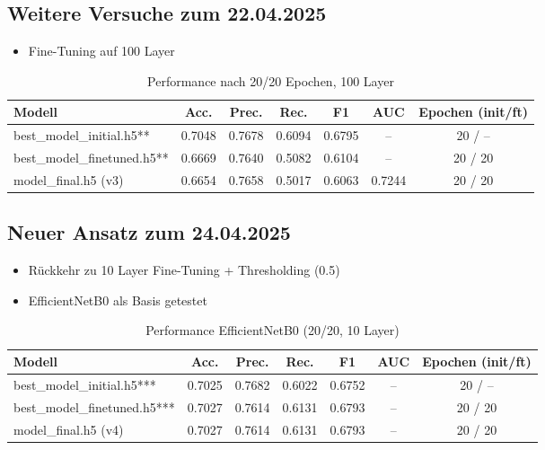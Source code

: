 \subsection*{Weitere Versuche zum 22.04.2025}
\begin{itemize}
  \item Fine-Tuning auf 100 Layer
\end{itemize}
\begin{table}[h]
\centering
\caption{Performance nach 20/20 Epochen, 100 Layer}
\begin{tabular}{lcccccc}
\toprule
Modell                         & Acc.   & Prec.  & Rec.   & F1     & AUC    & Epochen (init/ft) \\
\midrule
best\_model\_initial.h5**      & 0.7048 & 0.7678 & 0.6094 & 0.6795 & –      & 20 / –            \\
best\_model\_finetuned.h5**    & 0.6669 & 0.7640 & 0.5082 & 0.6104 & –      & 20 / 20           \\
model\_final.h5 (v3)           & 0.6654 & 0.7658 & 0.5017 & 0.6063 & 0.7244 & 20 / 20           \\
\bottomrule
\end{tabular}
\end{table}

\subsection*{Neuer Ansatz zum 24.04.2025}
\begin{itemize}
  \item Rückkehr zu 10 Layer Fine-Tuning + Thresholding (0.5)
  \item EfficientNetB0 als Basis getestet
\end{itemize}
\begin{table}[h]
\centering
\caption{Performance EfficientNetB0 (20/20, 10 Layer)}
\begin{tabular}{lcccccc}
\toprule
Modell                         & Acc.   & Prec.  & Rec.   & F1     & AUC & Epochen (init/ft) \\
\midrule
best\_model\_initial.h5***     & 0.7025 & 0.7682 & 0.6022 & 0.6752 & –   & 20 / –            \\
best\_model\_finetuned.h5***   & 0.7027 & 0.7614 & 0.6131 & 0.6793 & –   & 20 / 20           \\
model\_final.h5 (v4)           & 0.7027 & 0.7614 & 0.6131 & 0.6793 & –   & 20 / 20           \\
\bottomrule
\end{tabular}
\end{table}

